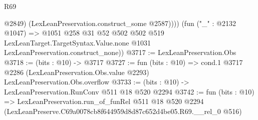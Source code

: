 \begin{lexlean}{R69}
\begin{coremodule}
              @2849)
            (LexLeanPreservation.construct_some @2587))))
      (fun ("_" : @2132 @1047) =>
      @1051
        @258
        @31
        @52
        @502
        @502
        @519
        LexLeanTarget.TargetSyntax.Value.none
        @1031
        LexLeanPreservation.construct_none))
@3717 := LexLeanPreservation.Obs
@3718 := (bits : @10) -> @3717
@3727 := fun (bits : @10) =>
  cond.{1} @3717 @2286 (LexLeanPreservation.Obs.value @2293) LexLeanPreservation.Obs.overflow
@3733 := (bits : @10) -> LexLeanPreservation.RunConv @511 @18 @520 @2294
@3742 := fun (bits : @10) =>
  LexLeanPreservation.run_of_funRel
    @511
    @18
    @520
    @2294
    (LexLeanPreserve.C69a0078cb8f644959d8d87c652d4be05.R69.__rel_0 @516)
\end{coremodule}
\end{lexlean}
